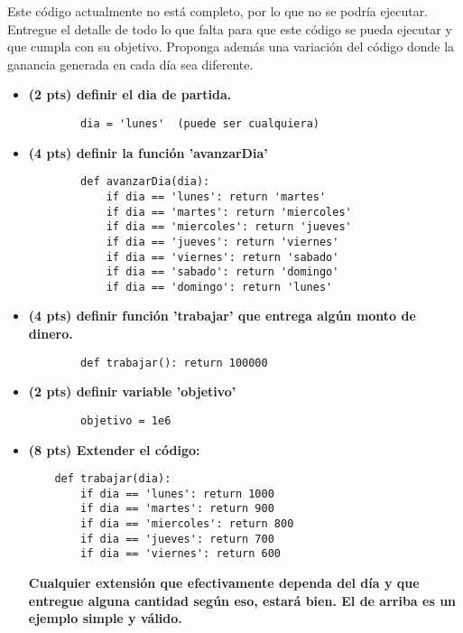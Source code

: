 \documentclass{article}
\begin{document}
Este código actualmente no está completo, por lo que no se podría ejecutar. Entregue el detalle de todo lo que falta para que este código se pueda ejecutar y que cumpla con su objetivo. Proponga además una variación del código donde la ganancia generada en cada día sea diferente. 

\begin{itemize}
    \item  \textbf{(2 pts) definir el dia de partida. }

    \begin{verbatim}
        dia = 'lunes'  (puede ser cualquiera)
    \end{verbatim}

    \item \textbf{(4 pts) definir la función 'avanzarDia' }

    \begin{verbatim}
        def avanzarDia(dia):
            if dia == 'lunes': return 'martes'
            if dia == 'martes': return 'miercoles'
            if dia == 'miercoles': return 'jueves'
            if dia == 'jueves': return 'viernes'
            if dia == 'viernes': return 'sabado'
            if dia == 'sabado': return 'domingo'
            if dia == 'domingo': return 'lunes'
    \end{verbatim}
    
    \item \textbf{(4 pts) definir función 'trabajar' que entrega algún monto de dinero. }

    \begin{verbatim}
        def trabajar(): return 100000
    \end{verbatim}

    \item \textbf{(2 pts) definir variable 'objetivo' }

    \begin{verbatim}
        objetivo = 1e6 
    \end{verbatim}

    \item \textbf{(8 pts) Extender el código: }

    \begin{verbatim}
    def trabajar(dia): 
        if dia == 'lunes': return 1000
        if dia == 'martes': return 900
        if dia == 'miercoles': return 800
        if dia == 'jueves': return 700
        if dia == 'viernes': return 600
    \end{verbatim}
    
    \textbf{Cualquier extensión que efectivamente dependa del día y que entregue alguna cantidad según eso, estará bien. El de arriba es un ejemplo simple y válido.}
\end{itemize}
     
\end{document}

